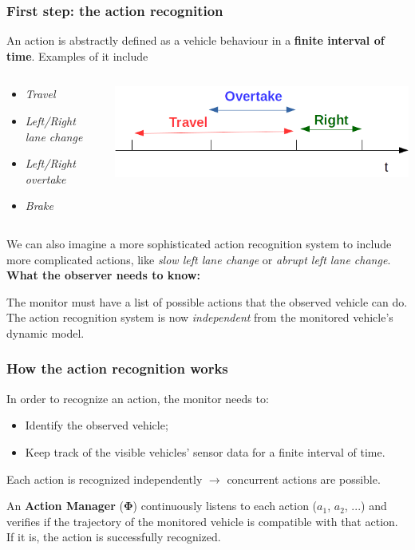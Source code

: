 \documentclass{beamer}
\begin{document}
\begin{frame}
\frametitle{First step: the action recognition}
An action is abstractly defined as a vehicle behaviour in a \textbf{finite interval of time}. Examples of
it include 
\begin{columns}
\begin{column}{0.4\textwidth}
\begin{itemize}
\item \textit{Travel}
\item \textit{Left/Right lane change}
\item \textit{Left/Right overtake}
\item \textit{Brake}
\end{itemize}
\end{column}
\begin{column}{0.6\textwidth}
\flushright
\includegraphics[scale=0.4]{actionsTimeline}
\end{column}
\end{columns}

\bigskip

We can also imagine a more sophisticated action recognition system
to include more complicated actions, like \textit{slow left lane change} or
\textit{abrupt left lane change}.\\

\textbf{What the observer needs to know:}

The monitor must have a list of possible actions that the 
observed vehicle can do. The action recognition system is now \emph{independent} from the monitored vehicle's dynamic model. 
\end{frame}

\begin{frame}
\frametitle{How the action recognition works}
In order to recognize an action, the monitor needs to:
\begin{itemize}
\item Identify the observed vehicle;
\item Keep track of the visible vehicles' sensor data for a finite interval of time.
\end{itemize}

Each action is recognized independently $\rightarrow$ concurrent actions are possible.

\bigskip

An \textbf{Action Manager} ($\mathbf{\Phi}$) continuously listens to each action ($a_1$, $a_2$, ...) and verifies if the trajectory of the monitored vehicle is compatible with that action. If it is, the action is successfully recognized.

\end{frame}
\end{document}
